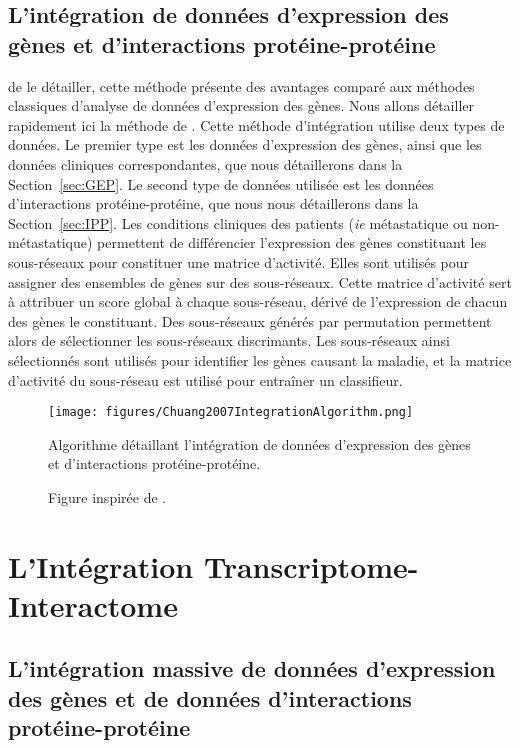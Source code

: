 			\pagebreak

		\subsection{\textcolor{green!45!black}{L'intégration de données d'expression des gènes et d'interactions protéine-protéine}}
			 de le détailler, cette méthode présente des avantages comparé aux méthodes classiques d'analyse de données d'expression des gènes.
			Nous allons détailler rapidement ici la méthode de \citeauthor{Chuang2007}.
			Cette méthode d'intégration utilise deux types de données.
			Le premier type est les données d'expression des gènes, ainsi que les données cliniques correspondantes, que nous détaillerons dans la Section~\ref{sec:GEP}.
			Le second type de données utilisée est les données d'interactions protéine-protéine, que nous nous détaillerons dans la Section~\ref{sec:IPP}.
			Les conditions cliniques des patients (\emph{ie} métastatique ou non-métastatique) permettent de différencier l'expression des gènes constituant les sous-réseaux pour constituer une matrice d'activité.
			Elles sont utilisés pour assigner des ensembles de gènes sur des sous-réseaux.
			Cette matrice d'activité sert à attribuer un score global à chaque sous-réseau, dérivé de l'expression de chacun des gènes le constituant.
			Des sous-réseaux générés par permutation permettent alors de sélectionner les sous-réseaux discrimants.
			Les sous-réseaux ainsi sélectionnés sont utilisés pour identifier les gènes causant la maladie, et la matrice d'activité du sous-réseau est utilisé pour entraîner un classifieur.

			\begin{figure}
				\centering
				\texttt{[image: figures/Chuang2007IntegrationAlgorithm.png]}
				\caption{Algorithme détaillant l'intégration de données d'expression des gènes et d'interactions protéine-protéine.}
				\label{fig:Chuang2007IntegrationAlgorithm}
				\caption*{Figure inspirée de \citeauthor{Chuang2007}.}
			\end{figure}
		
	\section{\textcolor{green!45!black}{L'Intégration Transcriptome-Interactome}}

		\subsection{\textcolor{green!45!black}{L'intégration massive de données d'expression des gènes et de données d'interactions protéine-protéine}}


